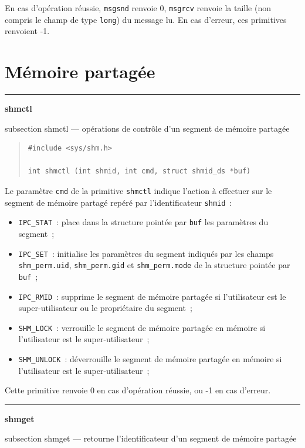\documentclass [twoside] {report}
\newcommand {\primitive} [1]
    {
	\phantomsection
	{\large \textbf {#1}}
	\addcontentsline {toc} {subsection} {#1}
    }
\newcommand {\separation}
    {
	\vspace {5mm}
	\nopagebreak
	\hrule
    }
\begin{document}
En cas d'opération réussie, \texttt {msgsnd} renvoie 0, \texttt {msgrcv} renvoie
la taille (non compris le champ de type \texttt {long}) du message lu.
En cas d'erreur, ces primitives renvoient -1.



\section* {Mémoire partagée}

\separation
\primitive {shmctl} --- opérations de contrôle d'un segment de mémoire partagée

\begin {quote}
\begin {verbatim}
#include <sys/shm.h>

int shmctl (int shmid, int cmd, struct shmid_ds *buf)
\end{verbatim}
\end {quote}

Le paramètre \texttt {cmd} de la primitive \texttt {shmctl} indique l'action à
effectuer sur le segment de mémoire partagé repéré par l'identificateur
\texttt {shmid}~:

\begin {itemize}
    \item \texttt {IPC\_STAT}~:  place dans la structure pointée par
	\texttt {buf} les paramètres du segment~;
    \item \texttt {IPC\_SET}~:  initialise les paramètres du segment
	indiqués par les champs \texttt {shm\_perm.uid}, \texttt {shm\_perm.gid}
	et \texttt {shm\_perm.mode} de la structure pointée par \texttt {buf}~;
    \item \texttt {IPC\_RMID}~:  supprime le segment de mémoire partagée si
	l'utilisateur est le super-utilisateur ou le propriétaire du
	segment~;
    \item \texttt {SHM\_LOCK}~:  verrouille le segment de mémoire partagée
	en mémoire si l'utilisateur est le super-utilisateur~;
    \item \texttt {SHM\_UNLOCK}~:  déverrouille le segment de mémoire
	partagée en mémoire si l'utilisateur est le super-utilisateur~;
\end {itemize}

Cette primitive renvoie 0 en cas d'opération
réussie, ou -1 en cas d'erreur.



\separation
\primitive {shmget} --- retourne l'identificateur d'un segment de mémoire partagée
    \label {shmget}
\end{document}
